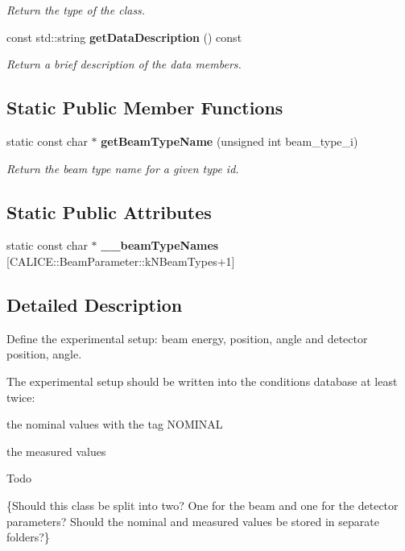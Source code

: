 \begin{DoxyCompactItemize}
\begin{DoxyCompactList}\small\item\em Return the type of the class. \end{DoxyCompactList}\item 
const std\-::string {\bf get\-Data\-Description} () const \label{classCALICE_1_1BeamParameter_adf804091f7b3991b2dbec8bc9b5db5fb}

\begin{DoxyCompactList}\small\item\em Return a brief description of the data members. \end{DoxyCompactList}\end{DoxyCompactItemize}
\subsection*{Static Public Member Functions}
\begin{DoxyCompactItemize}
\item 
static const char $\ast$ {\bf get\-Beam\-Type\-Name} (unsigned int beam\-\_\-type\-\_\-i)\label{classCALICE_1_1BeamParameter_add13ac5aa7c9fab9a5572f6673ff8dc6}

\begin{DoxyCompactList}\small\item\em Return the beam type name for a given type id. \end{DoxyCompactList}\end{DoxyCompactItemize}
\subsection*{Static Public Attributes}
\begin{DoxyCompactItemize}
\item 
static const char $\ast$ {\bfseries \-\_\-\-\_\-beam\-Type\-Names} [C\-A\-L\-I\-C\-E\-::\-Beam\-Parameter\-::k\-N\-Beam\-Types+1]
\end{DoxyCompactItemize}


\subsection{Detailed Description}
Define the experimental setup\-: beam energy, position, angle and detector position, angle. 

The experimental setup should be written into the conditions database at least twice\-: 
\begin{DoxyItemize}
\item the nominal values with the tag N\-O\-M\-I\-N\-A\-L 
\item the measured values 
\end{DoxyItemize}\begin{DoxyRefDesc}{Todo}
\item[{\bf Todo}]\{Should this class be split into two? One for the beam and one for the detector parameters? Should the nominal and measured values be stored in separate folders?\} \end{DoxyRefDesc}


